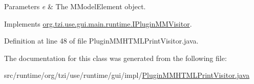 \begin{DoxyParams}{Parameters}
{\em e} & The M\-Model\-Element object. \\
\hline
\end{DoxyParams}


Implements \hyperlink{interfaceorg_1_1tzi_1_1use_1_1gui_1_1main_1_1runtime_1_1_i_plugin_m_m_visitor_a4a426f6543270da11f1d8b74577f5e02}{org.\-tzi.\-use.\-gui.\-main.\-runtime.\-I\-Plugin\-M\-M\-Visitor}.



Definition at line 48 of file Plugin\-M\-M\-H\-T\-M\-L\-Print\-Visitor.\-java.



The documentation for this class was generated from the following file\-:\begin{DoxyCompactItemize}
\item 
src/runtime/org/tzi/use/runtime/gui/impl/\hyperlink{_plugin_m_m_h_t_m_l_print_visitor_8java}{Plugin\-M\-M\-H\-T\-M\-L\-Print\-Visitor.\-java}\end{DoxyCompactItemize}
